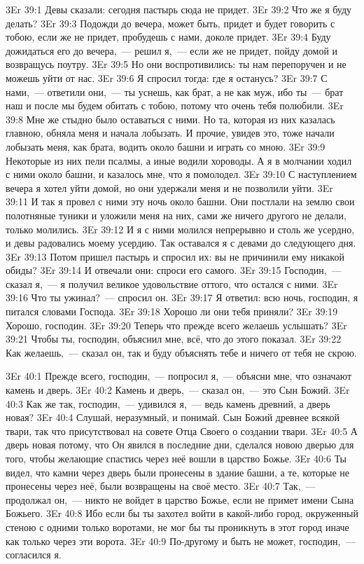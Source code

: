 \vs 3Er 39:1
Девы сказали: сегодня
пастырь сюда не придет.
\vs 3Er 39:2
Что же я буду делать?
\vs 3Er 39:3
Подожди до вечера, может
быть, придет и будет говорить с тобою, если же не придет, пробудешь с нами,
доколе придет.
\vs 3Er 39:4
Буду дожидаться его до
вечера,~--- решил я,~--- если же не придет, пойду домой и возвращусь поутру.
\vs 3Er 39:5
Но они воспротивились: ты
нам перепоручен и не можешь уйти от нас.
\vs 3Er 39:6
Я спросил тогда: где я
останусь?
\vs 3Er 39:7
С нами,~--- ответили они,~--- ты уснешь, как брат, а не как муж, ибо ты~--- брат наш и после мы будем обитать
с тобою, потому что очень тебя полюбили.
\vs 3Er 39:8
Мне же стыдно было
оставаться с ними. Но та, которая из них казалась главною, обняла меня и
начала лобызать. И прочие, увидев это, тоже начали лобызать меня, как брата,
водить около башни и играть со мною.
\vs 3Er 39:9
Некоторые из них пели
псалмы, а иные водили хороводы. А я в молчании ходил с ними около башни, и
казалось мне, что я помолодел.
\vs 3Er 39:10
С наступлением вечера я
хотел уйти домой, но они удержали меня и не позволили уйти.
\vs 3Er 39:11
И так я провел с ними эту
ночь около башни. Они постлали на землю свои полотняные туники и уложили меня
на них, сами же ничего другого не делали, только молились.
\vs 3Er 39:12
И я с ними молился
непрерывно и столь же усердно, и девы радовались моему усердию. Так оставался
я с девами до следующего дня.
\vs 3Er 39:13
Потом пришел пастырь и
спросил их: вы не причинили ему никакой обиды?
\vs 3Er 39:14
И отвечали они: спроси
его самого.
\vs 3Er 39:15
Господин,~--- сказал я,~--- я
получил великое удовольствие оттого, что остался с ними.
\vs 3Er 39:16
Что ты ужинал?~--- спросил
он.
\vs 3Er 39:17
Я ответил: всю ночь,
господин, я питался словами Господа.
\vs 3Er 39:18
Хорошо ли они тебя
приняли?
\vs 3Er 39:19
Хорошо, господин.
\vs 3Er 39:20
Теперь что прежде всего
желаешь услышать?
\vs 3Er 39:21
Чтобы ты, господин,
объяснил мне, всё, что до этого показал.
\vs 3Er 39:22
Как желаешь,~--- сказал он,
так и буду объяснять тебе и ничего от тебя не скрою.

\vs 3Er 40:1
Прежде всего, господин,~--- попросил я,~--- объясни мне, что означают камень и дверь.
\vs 3Er 40:2
Камень и дверь,~--- сказал
он,~--- это Сын Божий.
\vs 3Er 40:3
Как же так, господин,~--- удивился я,~--- ведь камень древний, а дверь новая?
\vs 3Er 40:4
Слушай, неразумный, и
понимай. Сын Божий древнее всякой твари, так что присутствовал на совете Отца
Своего о создании твари.
\vs 3Er 40:5
А дверь новая потому, что
Он явился в последние дни, сделался новою дверью для того, чтобы желающие
спастись через неё вошли в царство Божье.
\vs 3Er 40:6
Ты видел, что камни через
дверь были пронесены в здание башни, а те, которые не пронесены через неё,
были возвращены на своё место.
\vs 3Er 40:7
Так,~--- продолжал он,~--- никто не войдет в царство Божье, если не примет имени Сына Божьего.
\vs 3Er 40:8
Ибо если бы ты захотел
войти в какой-либо город, окруженный стеною с одними только воротами, не мог
бы ты проникнуть в этот город иначе как только через эти ворота.
\vs 3Er 40:9
По-другому и быть не
может, господин,~--- согласился я.

